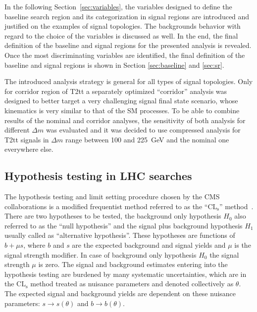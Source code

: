 In the following Section~\ref{sec:variables}, the variables designed to define the baseline search region and its categorization in signal regions are introduced and justified on the examples of signal topologies. The backgrounds behavior with regard to the choice of the variables is discussed as well. In the end, the final definition of the baseline and signal regions for the presented analysis is revealed. Once the most discriminating variables are identified, the final definition of the baseline and signal regions is shown in Section \ref{sec:baseline} and \ref{sec:sr}. 

The introduced analysis strategy is general for all types of signal topologies. Only for corridor region of T2tt a separately optimized ``corridor'' analysis was designed to better target a very challenging signal final state scenario, whose kinematics is very similar to that of the SM processes. To be able to combine results of the nominal and corridor analyses, the sensitivity of both analysis for different $\Delta m$ was evaluated and it was decided to use compressed analysis for T2tt signals in $\Delta m$ range between 100 and 225~GeV and the nominal one everywhere else.



\subsection{Hypothesis testing in LHC searches~\label{sec:stats} }

The hypothesis testing and limit setting procedure chosen by the CMS collaborations is a modified frequentist method referred to as the ``$\mathrm{CL_{s}}$'' method~\cite{Read:2002hq, CMS-NOTE-2011-005}. There are two hypotheses to be tested, the background only hypothesis $H_{0}$ also referred to as the ``null hypothesis'' and the signal plus background hypothesis $H_{1}$ usually called as ``alternative hypothesis''. These hypotheses are functions of $b+\mu s$, where $b$ and $s$ are the expected background and signal yields and $\mu$ is the signal strength modifier. In case of background only hypothesis $H_{0}$ the signal strength $\mu$ is zero. The signal and background estimates entering into the hypothesis testing are burdened by many systematic uncertainties, which are in the $\mathrm{CL_{s}}$ method treated as nuisance parameters and denoted collectively as $\theta$. The expected signal and background yields are dependent on these nuisance parameters: $s \to s(\theta)$ and $b \to b(\theta)$.


